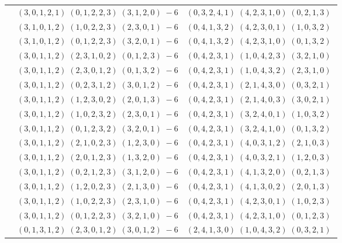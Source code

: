 \documentclass[11pt]{article}
\begin{document}
\begin{longtable}[l]{|c|c|c|}
 \cline{2-3} 
 & $(3 ,0 ,1 ,2 ,1) \;(0 ,1 ,2 ,2 ,3) \;(3 ,1 ,2 ,0) \;-6$ & $(0 ,3 ,2 ,4 ,1) \;(4 ,2 ,3 ,1 ,0) \;(0 ,2 ,1 ,3) \;$\\ 
 \cline{2-3} 
 & $(3 ,1 ,0 ,1 ,2) \;(1 ,0 ,2 ,2 ,3) \;(2 ,3 ,0 ,1) \;-6$ & $(0 ,4 ,1 ,3 ,2) \;(4 ,2 ,3 ,0 ,1) \;(1 ,0 ,3 ,2) \;$\\ 
 \cline{2-3} 
 & $(3 ,1 ,0 ,1 ,2) \;(0 ,1 ,2 ,2 ,3) \;(3 ,2 ,0 ,1) \;-6$ & $(0 ,4 ,1 ,3 ,2) \;(4 ,2 ,3 ,1 ,0) \;(0 ,1 ,3 ,2) \;$\\ 
 \cline{2-3} 
 & $(3 ,0 ,1 ,1 ,2) \;(2 ,3 ,1 ,0 ,2) \;(0 ,1 ,2 ,3) \;-6$ & $(0 ,4 ,2 ,3 ,1) \;(1 ,0 ,4 ,2 ,3) \;(3 ,2 ,1 ,0) \;$\\ 
 \cline{2-3} 
 & $(3 ,0 ,1 ,1 ,2) \;(2 ,3 ,0 ,1 ,2) \;(0 ,1 ,3 ,2) \;-6$ & $(0 ,4 ,2 ,3 ,1) \;(1 ,0 ,4 ,3 ,2) \;(2 ,3 ,1 ,0) \;$\\ 
 \cline{2-3} 
 & $(3 ,0 ,1 ,1 ,2) \;(0 ,2 ,3 ,1 ,2) \;(3 ,0 ,1 ,2) \;-6$ & $(0 ,4 ,2 ,3 ,1) \;(2 ,1 ,4 ,3 ,0) \;(0 ,3 ,2 ,1) \;$\\ 
 \cline{2-3} 
 & $(3 ,0 ,1 ,1 ,2) \;(1 ,2 ,3 ,0 ,2) \;(2 ,0 ,1 ,3) \;-6$ & $(0 ,4 ,2 ,3 ,1) \;(2 ,1 ,4 ,0 ,3) \;(3 ,0 ,2 ,1) \;$\\ 
 \cline{2-3} 
 & $(3 ,0 ,1 ,1 ,2) \;(1 ,0 ,2 ,3 ,2) \;(2 ,3 ,0 ,1) \;-6$ & $(0 ,4 ,2 ,3 ,1) \;(3 ,2 ,4 ,0 ,1) \;(1 ,0 ,3 ,2) \;$\\ 
 \cline{2-3} 
 & $(3 ,0 ,1 ,1 ,2) \;(0 ,1 ,2 ,3 ,2) \;(3 ,2 ,0 ,1) \;-6$ & $(0 ,4 ,2 ,3 ,1) \;(3 ,2 ,4 ,1 ,0) \;(0 ,1 ,3 ,2) \;$\\ 
 \cline{2-3} 
 & $(3 ,0 ,1 ,1 ,2) \;(2 ,1 ,0 ,2 ,3) \;(1 ,2 ,3 ,0) \;-6$ & $(0 ,4 ,2 ,3 ,1) \;(4 ,0 ,3 ,1 ,2) \;(2 ,1 ,0 ,3) \;$\\ 
 \cline{2-3} 
 & $(3 ,0 ,1 ,1 ,2) \;(2 ,0 ,1 ,2 ,3) \;(1 ,3 ,2 ,0) \;-6$ & $(0 ,4 ,2 ,3 ,1) \;(4 ,0 ,3 ,2 ,1) \;(1 ,2 ,0 ,3) \;$\\ 
 \cline{2-3} 
 & $(3 ,0 ,1 ,1 ,2) \;(0 ,2 ,1 ,2 ,3) \;(3 ,1 ,2 ,0) \;-6$ & $(0 ,4 ,2 ,3 ,1) \;(4 ,1 ,3 ,2 ,0) \;(0 ,2 ,1 ,3) \;$\\ 
 \cline{2-3} 
 & $(3 ,0 ,1 ,1 ,2) \;(1 ,2 ,0 ,2 ,3) \;(2 ,1 ,3 ,0) \;-6$ & $(0 ,4 ,2 ,3 ,1) \;(4 ,1 ,3 ,0 ,2) \;(2 ,0 ,1 ,3) \;$\\ 
 \cline{2-3} 
 & $(3 ,0 ,1 ,1 ,2) \;(1 ,0 ,2 ,2 ,3) \;(2 ,3 ,1 ,0) \;-6$ & $(0 ,4 ,2 ,3 ,1) \;(4 ,2 ,3 ,0 ,1) \;(1 ,0 ,2 ,3) \;$\\ 
 \cline{2-3} 
 & $(3 ,0 ,1 ,1 ,2) \;(0 ,1 ,2 ,2 ,3) \;(3 ,2 ,1 ,0) \;-6$ & $(0 ,4 ,2 ,3 ,1) \;(4 ,2 ,3 ,1 ,0) \;(0 ,1 ,2 ,3) \;$\\ 
 \cline{2-3} 
 & $(0 ,1 ,3 ,1 ,2) \;(2 ,3 ,0 ,1 ,2) \;(3 ,0 ,1 ,2) \;-6$ & $(2 ,4 ,1 ,3 ,0) \;(1 ,0 ,4 ,3 ,2) \;(0 ,3 ,2 ,1) \;$\\ 

\end{longtable}
\end{document}
